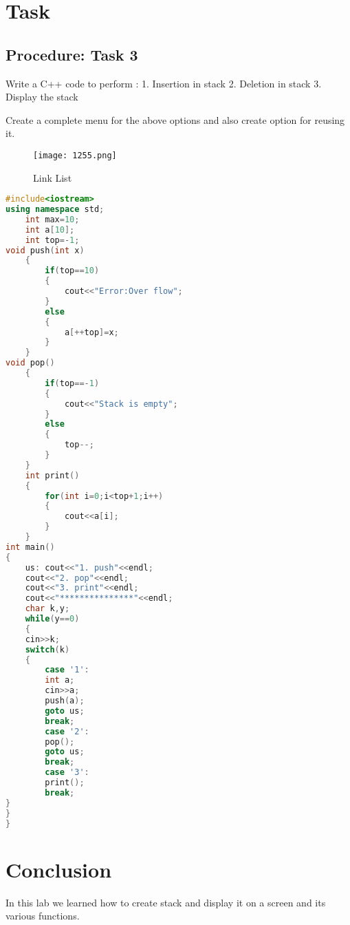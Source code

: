 \documentclass[11pt]{article}            %
\begin{document}
\section{Task}  
\subsection{Procedure: Task 3 }     
Write a C++ code to perform :
1. Insertion in stack
2. Deletion in stack
3. Display the stack

Create a complete menu for the above options and also create option for reusing it.

\begin{figure*}
\centering
  \texttt{[image: 1255.png]}
\caption{Link List}
\label{Figure:3}    
\end{figure*}

\begin{lstlisting}[language=C++]
#include<iostream>
using namespace std;
	int max=10;
	int a[10];
	int top=-1;
void push(int x)
	{
		if(top==10)
		{
			cout<<"Error:Over flow";
		}
		else
		{
			a[++top]=x;
		}
	}
void pop()
	{
		if(top==-1)
		{
			cout<<"Stack is empty";
		}
		else
		{
			top--;
		}
	}
	int print()
	{
		for(int i=0;i<top+1;i++)
		{
			cout<<a[i];
		}
	}
int main()
{	
	us: cout<<"1. push"<<endl;
	cout<<"2. pop"<<endl;
	cout<<"3. print"<<endl;
	cout<<"***************"<<endl;
	char k,y;
	while(y==0)
	{
	cin>>k;
	switch(k)
	{
		case '1':
		int a;
		cin>>a;
		push(a);
		goto us;
		break;
		case '2':
		pop();
		goto us;
		break;
		case '3':
		print();
		break;
}
}
}
\end{lstlisting}

\section{Conclusion}  
In this lab we learned how to create stack and display it on a screen and its various functions.

 
\end{document}
